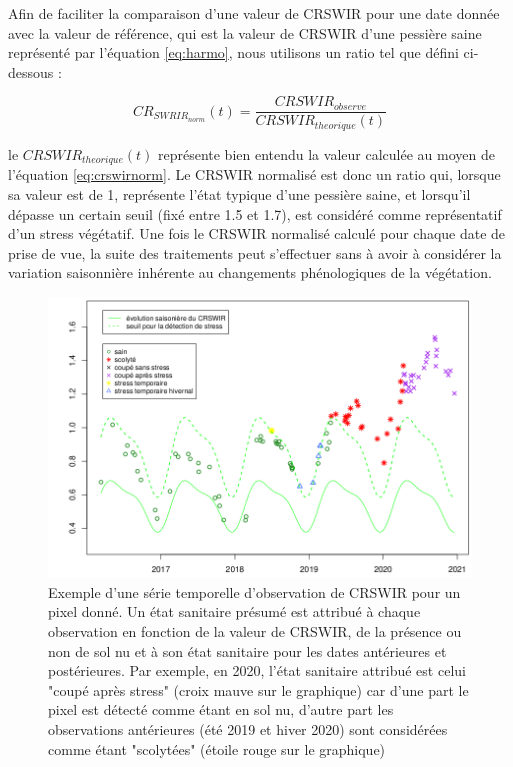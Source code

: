 \documentclass[a4paper, 12pt]{article} %
\begin{document}
Afin de faciliter la comparaison d'une valeur de CRSWIR pour une date donnée avec la valeur de référence, qui est la valeur de CRSWIR d'une pessière saine représenté par l'équation \ref{eq:harmo}, nous utilisons un ratio tel que défini ci-dessous :

\begin{equation}\label{eq:crswirnorm}
CR_{SWRIR_{norm}}(t)=\dfrac{CRSWIR_{observe}}{CRSWIR_{theorique}(t)}
\end{equation} 

le $CRSWIR_{theorique}(t)$ représente bien entendu la valeur calculée au moyen de l'équation \ref{eq:crswirnorm}. Le CRSWIR normalisé est donc un ratio qui, lorsque sa valeur est de 1, représente l'état typique d'une pessière saine, et lorsqu'il dépasse un certain seuil (fixé entre 1.5 et 1.7), est considéré comme représentatif d'un stress végétatif. Une fois le CRSWIR normalisé calculé pour chaque date de prise de vue, la suite des traitements peut s'effectuer sans à avoir à considérer la variation saisonnière inhérente au changements phénologiques de la végétation.

\begin{figure}[H]
	\centering
	\includegraphics[width=0.9\linewidth]{illuArbreCoupe.png}
	\caption{Exemple d'une série temporelle d'observation de CRSWIR pour un pixel donné. Un état sanitaire présumé est attribué à chaque observation en fonction de la valeur de CRSWIR, de la présence ou non de sol nu et à son état sanitaire pour les dates antérieures et postérieures. Par exemple, en 2020, l'état sanitaire attribué est celui "coupé après stress" (croix mauve sur le graphique) car d'une part le pixel est détecté comme étant en sol nu, d'autre part les observations antérieures (été 2019 et hiver 2020) sont considérées comme étant "scolytées" (étoile rouge sur le graphique) }
	\label{fig:ex}
\end{figure}
\end{document}
